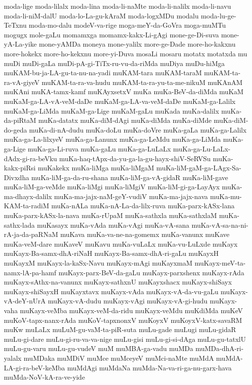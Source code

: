 {moda-lige
moda-lilalx
moda-lina
moda-li-naMte
moda-li-nalilx
moda-li-navu
moda-li-niM-dalU
moda-lo-La-gu-kAraM
moda-logxMDu
modalu
moda-lu-ge-TeTxnu
moda-mo-dalu
modeV-va-rige
moga-meY-da-GoVra
moga-muMTu
mogugx
mole-gaLu
momamxga
momamx-kakx-Li-gAgi
mone-ge-Di-suva
mone-yA-La-yike
mone-yAMDa
moneya
mone-yalilx
more-ge-Dade
more-ho-kakxnu
more-hokekx
more-ho-kekxnu
more-yi-Duva
mosaLi
mosaru
motatx
motatxda
mu
muDi
muDi-gaLa
muDi-pA-gi-TiTx-ru-vu-da-riMda
muDiya
muDu-hiMga
muKAM-bu-ja-LA-gu-ta-nu-na-yadi
muKAM-tara
muKAM-taraM
muKAM-ta-ra-vA-giyeV
muKAM-ta-ra-va-hudu
muKAM-ta-ra-yu-ta-me-nikuM
muKAnAM
muKAni
muKA-tamx-kamf
muKAyxsetxV
muKa
muKa-BeV-da-diMda
muKaM
muKaM-ga-LA-vA-veM-daDe
muKaM-ga-LA-va-veM-daDe
muKaM-ga-Lalilx
muKaM-ga-LiMda
muKaM-ga-Lige
muKaM-gaLu
muKada
muKa-dalilx
muKa-da-piRtaM
muKa-datatx
muKa-diM-dAgi
muKa-diMda
muKa-diMde
muKa-diM-do-geda
muKa-di-nA-dudu
muKa-doLu
muKa-doVre
muKa-gaLa
muKa-ga-Lalilx
muKa-ga-La-lilxyeV
muKa-ga-Lanunx
muKa-ga-LeMdu
muKa-ga-LiMda
muKa-ga-Lige
muKa-ga-Li-ruva
muKa-gaLu
muKa-ga-LuLaLx
muKa-ga-Lu-LaLx-dAdx-gi-ra-beVku
muKa-haq-tApx-da-yu-ga-la-gu-hayx-shiV-SeRVSu
muKa-kakx-piRsi
muKakekx
muKa-liMga
muKa-liMgaM
muKa-liM-gaM-ga-LAgx-Sa-Divxdha
muKa-liM-ga-da-ru-shana
muKa-liM-ga-vA-gidaR
muKa-liM-gave
muKa-liM-ga-veMde
muKa-liMgi
muKa-liMgiV
muKa-liM-gi-ga-LayAyx
muKa-ma-dhayx-dalilx
muKa-ma-jajx-naM-geY-vudiV
muKa-ma-jajx-nava
muKa-mu-KAM-ta-radiM
muKa-nALa
muKa-nA-La-da-lilx-ruva
muKa-parx-kASx-lana
muKa-parx-kASx-la-nava
muKa-rUpaM
muKa-sathxla
muKa-sathxlaM
muKa-sathx-lada
muKasayx
muKa-vAda
muKa-vAgi
muKa-vA-sana
muKa-vA-sa-na-ni-rA-ja-da-paRNaM
muKava
muKa-va-ne-na-gomemx
muKa-vanunx
muKave
muKa-veM-dare
muKaveV
muKavu
muKa-vuLaLx
muKa-vu-LuLxde
muKayx
muKayx-Ba-samx-dhA-riNaH
muKayx-Ba-samx-dhA-ri-gaLu
muKayxH
muKayxM
muKayx-la-kaSx-Navu
muKayx-mAgi
muKayxmaM
muKayx-meV-ta-namx-lA-pa-hamf
muKayx-parx-BeV-da-gaLu
muKayx-parxshenx
muKayx-rAda
muKayx-sAthx-na-vanunx
muKayx-sathxnU
muKayxshacx
muKayx-shiSayx
muKayx-shiSayxH
muKayxtavx
muKayx-vAda
muKayx-vA-da-vu-gaLu
muKayx-vA-deY-nUrA
muKayx-vA-dudu
muKayx-vAgi
muKayx-vA-gi-hudu
muKayx-vaha
muKayx-veMba
muKayx-veM-da-ridu
muKayx-veMdu
muKdiMda
muKeV
muKoV-tapx-nanx-rAda
muKoV-tapxnonxV
muKoyxV
muKoyxV-katx-savaRM
muKw
muLaLx
muLuM-gu-vaM-ta-piR-suta
muLu-gade
muLugi
muLu-gidaR
muLu-gi-dare
muLu-gi-ru-va-va-nige
muLu-gisi
muLu-gi-si-dAga
muLu-gu-tatxlU
muLu-gu-varu
muLu-gu-vudeV
muM
muMBA-ga-vadu
muMDa
muMDa-dhA-ri-yalalx
muMDaka
muMDiV
muMce
muMceyeV
muMci-naMte
muMdA
muMdA-LA-gi-ra-beV-keMba
muMdAgi
muMdaNa
muMda-Na-va-ri-ga-nu-garx-hava
muMda-NoV-kA-ra-ve-yide
}
